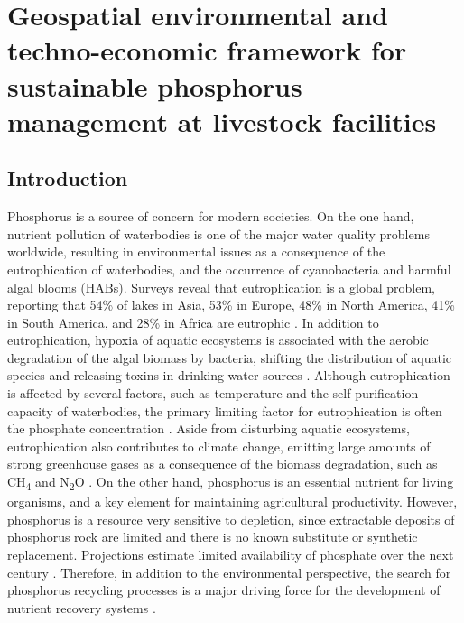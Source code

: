 \chapter{Geospatial environmental and techno-economic framework for	sustainable phosphorus management at livestock facilities}\label{ch:Tool}
\begin{refsection}[referencesCh4]
\section{Introduction}
Phosphorus is a source of concern for modern societies. On the one hand, nutrient pollution of waterbodies is one of the major water quality problems worldwide, resulting in environmental issues as a consequence of the eutrophication of waterbodies, and the occurrence of cyanobacteria and harmful algal blooms (HABs). Surveys reveal that eutrophication is a global problem, reporting that 54\% of lakes in Asia, 53\% in Europe, 48\% in North America, 41\% in South America, and 28\% in Africa are eutrophic \citep{ansari_eutrophication_2010}. In addition to eutrophication, hypoxia of aquatic ecosystems is associated with the aerobic degradation of the algal biomass by bacteria, shifting the distribution of aquatic species and releasing toxins in drinking water sources \citep{sampat_economic_2018}. Although eutrophication is affected by several factors, such as temperature and the self-purification capacity of waterbodies, the primary limiting factor for eutrophication is often the phosphate concentration \citep{Ullmanns}. Aside from disturbing aquatic ecosystems, eutrophication also contributes to climate change, emitting large amounts of strong greenhouse gases as a consequence of the biomass degradation, such as CH\textsubscript{4} and N\textsubscript{2}O \citep{beaulieu_eutrophication_2019}. On the other hand, phosphorus is an essential nutrient for living organisms, and a key element for maintaining agricultural productivity. However, phosphorus is a resource very sensitive to depletion, since extractable deposits of phosphorus rock are limited and there is no known substitute or synthetic replacement. Projections estimate limited availability of phosphate over the next century \citep{cordell_story_2009}. Therefore, in addition to the environmental perspective, the search for phosphorus recycling processes is a major driving force for the development of nutrient recovery systems \citep{reijnders2014phosphorus}.


\end{refsection}
